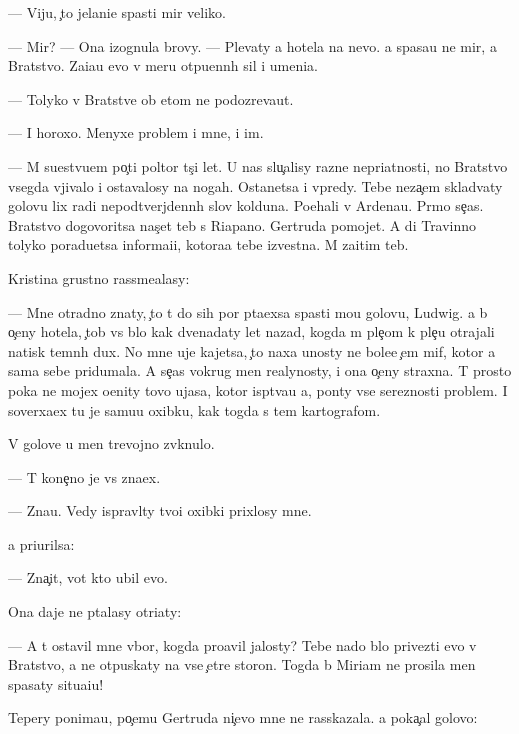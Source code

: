\documentclass[10pt]{book}
\begin{document}
— Viju, {\c}to jelani{\y}e spasti mir veliko.

— Mir? — Ona izognula brovy. — Plevaty {\y}a hotela na nevo. {\Y}a spasa{\y}u ne mir, a Bratstvo. Za{\x}i{\x}a{\y}u {\y}evo v meru otpu{\x}enn{\yi}h sil i umeni{\y}a.

— Tolyko v Bratstve ob etom ne podozreva{\y}ut.

— I horoxo. Menyxe problem i mne, i im.

— M{\yi} su{\x}estvu{\y}em po{\c}ti poltor{\yi} t{\yi}s{\ia}{\c}i let. U nas slu{\c}alisy razn{\yi}{\y}e nepri{\y}atnosti, no Bratstvo vsegda v{\yi}jivalo i ostavalosy na nogah. Ostanetsa i vpredy. Tebe neza{\c}em sklad{\yi}vaty golovu lix radi nepodtverjdenn{\yi}h slov kolduna. Po{\y}ehali v Ardenau. Pr{\ia}mo se{\y}{\c}as. Bratstvo dogovoritsa nas{\c}et teb{\ia} s Riapano. Gertruda pomojet. A di Travinno tolyko poradu{\y}etsa informa{\q}i{\y}i, kotora{\y}a tebe izvestna. M{\yi} za{\x}itim teb{\ia}.

Kristina grustno rassme{\y}alasy:

— Mne otradno znaty, {\c}to t{\yi} do sih por p{\yi}ta{\y}exsa spasti mo{\y}u golovu, Ludwig. {\Y}a b{\yi} o{\c}eny hotela, {\c}tob{\yi} vs{\e} b{\yi}lo kak dvenad{\q}aty let nazad, kogda m{\yi} ple{\c}om k ple{\c}u otrajali natisk temn{\yi}h dux. No mne uje kajetsa, {\c}to naxa {\y}unosty ne bole{\y}e {\c}em mif, kotor{\yi}{\y} {\y}a sama sebe pridumala. A se{\y}{\c}as vokrug men{\ia} realynosty, i ona o{\c}eny straxna. T{\yi} prosto poka ne mojex o{\q}enity tovo ujasa, kotor{\yi}{\y} isp{\yi}t{\yi}va{\y}u {\y}a, pon{\ia}ty vse{\y} ser{\y}eznosti problem{\yi}. I soverxa{\y}ex tu je samu{\y}u oxibku, kak togda s tem kartografom.

V golove u men{\ia} trevojno zv{\ia}knulo.

— T{\yi} kone{\c}no je vs{\e} zna{\y}ex.

— Zna{\y}u. Vedy ispravl{\ia}ty tvo{\y}i oxibki prixlosy mne.

{\Y}a pri{\x}urilsa:

— Zna{\c}it, vot kto ubil {\y}evo.

Ona daje ne p{\yi}talasy otri{\q}aty:

— A t{\yi} ostavil mne v{\yi}bor, kogda pro{\y}avil jalosty? Tebe nado b{\yi}lo privezti {\y}evo v Bratstvo, a ne otpuskaty na vse {\c}et{\yi}re storon{\yi}. Togda b{\yi} Miriam ne prosila men{\ia} spasaty situa{\q}i{\y}u!

Tepery ponima{\y}u, po{\c}emu Gertruda ni{\c}evo mne ne rasskazala. {\Y}a poka{\c}al golovo{\y}:
\end{document}
